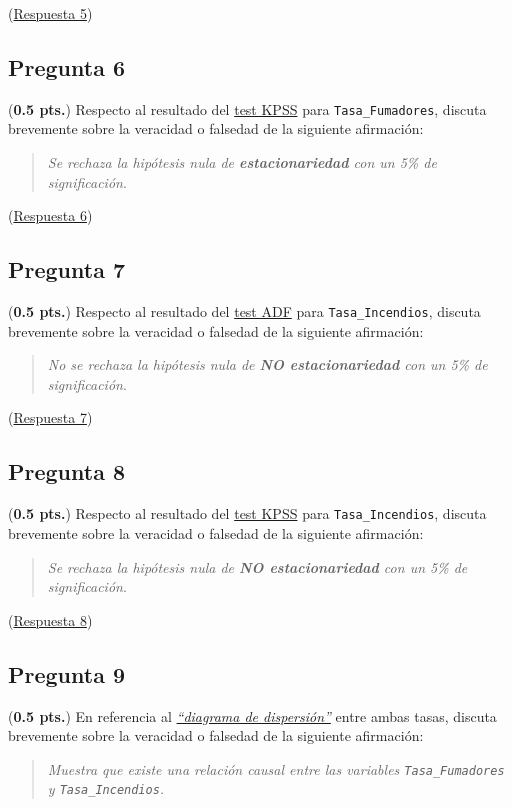 \documentclass[10pt]{article}
\begin{document}
(\hyperref[sec:orgfdf3e39]{Respuesta 5})
\subsection*{Pregunta 6}
\label{sec:orge014ae7}

(\textbf{0.5 pts.}) Respecto al resultado del \hyperref[sec:org7cb5c4c]{test KPSS} para \texttt{Tasa\_Fumadores}, discuta brevemente sobre la veracidad o falsedad de la siguiente afirmación:
\begin{quote}
\emph{Se rechaza la hipótesis nula de \textbf{estacionariedad} con un 5\% de significación}.
\end{quote}

(\hyperref[sec:orgf994f55]{Respuesta 6})
\subsection*{Pregunta 7}
\label{sec:orga095046}

(\textbf{0.5 pts.}) Respecto al resultado del \hyperref[sec:org0446c40]{test ADF} para \texttt{Tasa\_Incendios}, discuta brevemente sobre la veracidad o falsedad de la siguiente afirmación:
\begin{quote}
\emph{No se rechaza la hipótesis nula de \textbf{NO estacionariedad} con un 5\% de significación}.
\end{quote}

(\hyperref[sec:org1d2b1eb]{Respuesta 7})
\subsection*{Pregunta 8}
\label{sec:org4dca258}

(\textbf{0.5 pts.}) Respecto al resultado del \hyperref[sec:org0446c40]{test KPSS} para \texttt{Tasa\_Incendios}, discuta brevemente sobre la veracidad o falsedad de la siguiente afirmación:
\begin{quote}
\emph{Se rechaza la hipótesis nula de \textbf{NO estacionariedad} con un 5\% de significación}.
\end{quote}

(\hyperref[sec:org5ba66d1]{Respuesta 8})
\subsection*{Pregunta 9}
\label{sec:org5b2514e}

(\textbf{0.5 pts.}) En referencia al \hyperref[sec:org64872da]{\emph{``diagrama de dispersión''}} entre ambas tasas, discuta brevemente sobre la veracidad o falsedad de la siguiente afirmación:
\begin{quote}
\emph{Muestra que existe una relación causal entre las variables \texttt{Tasa\_Fumadores} y \texttt{Tasa\_Incendios}.}
\end{quote}
\end{document}
